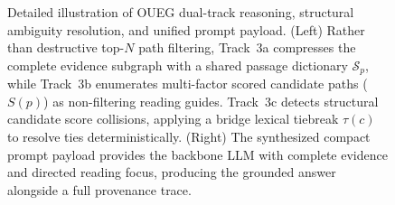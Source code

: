 \begin{figure}[t]
\centering
\resizebox{\linewidth}{!}{}
\vspace{-2mm}
\caption{Detailed illustration of OUEG dual-track reasoning, structural ambiguity resolution, and unified prompt payload. (Left) Rather than destructive top-$N$ path filtering, Track~3a compresses the complete evidence subgraph with a shared passage dictionary $\mathcal{S}_p$, while Track~3b enumerates multi-factor scored candidate paths ($S(p)$) as non-filtering reading guides. Track~3c detects structural candidate score collisions, applying a bridge lexical tiebreak $\tau(c)$ to resolve ties deterministically. (Right) The synthesized compact prompt payload provides the backbone LLM with complete evidence and directed reading focus, producing the grounded answer alongside a full provenance trace.}
\vspace{-2mm}
\label{fig:dual-track}
\end{figure}
